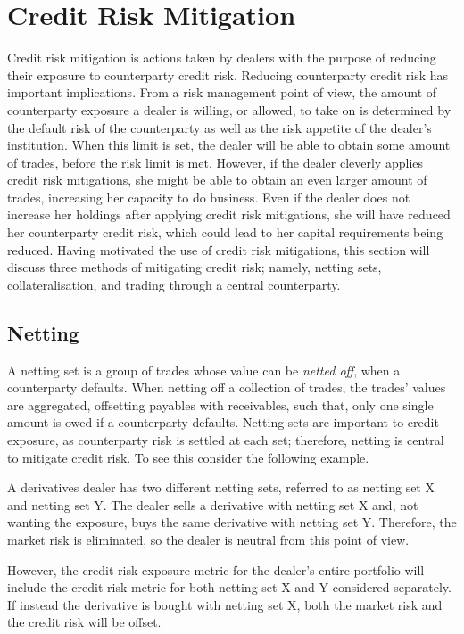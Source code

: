 \documentclass[main.tex]{subfiles}
\begin{document}
    \section{Credit Risk Mitigation}
    
    Credit risk mitigation is actions taken by dealers 
    with the purpose of reducing their exposure to counterparty credit risk.
    Reducing counterparty credit risk has important implications.
    From a risk management point of view,
    the amount of counterparty exposure a dealer is willing, or allowed, to take on 
    is determined by the default risk of the counterparty 
    as well as the risk appetite of the dealer's institution.
    When this limit is set, the dealer will be able to obtain some amount of trades,
    before the risk limit is met.
    However, if the dealer cleverly applies credit risk mitigations,
    she might be able to obtain an even larger amount of trades,
    increasing her capacity to do business.
    Even if the dealer does not increase her holdings after applying credit risk mitigations,
    she will have reduced her counterparty credit risk,
    which could lead to her capital requirements being reduced.
    Having motivated the use of credit risk mitigations,
    this section will discuss three methods of mitigating credit risk;
    namely, netting sets, collateralisation, and trading through a central counterparty.

    \subsection{Netting}
        A netting set is a group of trades whose value can be \textit{netted off}, 
        when a counterparty defaults.
        When netting off a collection of trades, the trades' values are aggregated,
        offsetting payables with receivables, such that,
        only one single amount is owed if a counterparty defaults.
        Netting sets are important to credit exposure, 
        as counterparty risk is settled at each set;
        therefore, netting is central to mitigate credit risk.
        To see this consider the following example.

        \begin{example}    
        A derivatives dealer has two different netting sets, 
        referred to as netting set X and netting set Y.
        The dealer sells a derivative with netting set X and, 
        not wanting the exposure, buys the same derivative with netting set Y.
        Therefore, the market risk is eliminated, so the dealer is neutral from this point of view.

        However, the credit risk exposure metric for the dealer's entire portfolio will include 
        the credit risk metric for both netting set X and Y considered separately.
        If instead the derivative is bought with netting set X,
        both the market risk and the credit risk will be offset.
        \end{example}
\end{document}
